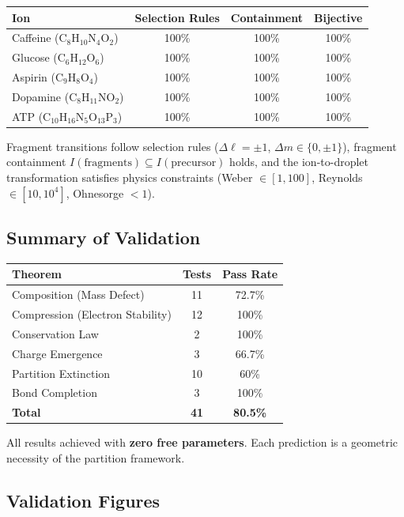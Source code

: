 \documentclass[twocolumn,10pt,a4paper]{article}
\theoremstyle{definition}
\theoremstyle{remark}
\begin{document}
\begin{center}
\begin{tabular}{lccc}
\toprule
Ion & Selection Rules & Containment & Bijective \\
\midrule
Caffeine (C$_8$H$_{10}$N$_4$O$_2$) & 100\% & 100\% & 100\% \\
Glucose (C$_6$H$_{12}$O$_6$) & 100\% & 100\% & 100\% \\
Aspirin (C$_9$H$_8$O$_4$) & 100\% & 100\% & 100\% \\
Dopamine (C$_8$H$_{11}$NO$_2$) & 100\% & 100\% & 100\% \\
ATP (C$_{10}$H$_{16}$N$_5$O$_{13}$P$_3$) & 100\% & 100\% & 100\% \\
\bottomrule
\end{tabular}
\end{center}

Fragment transitions follow selection rules ($\Delta \ell = \pm 1$, $\Delta m \in \{0, \pm 1\}$), fragment containment $I(\text{fragments}) \subseteq I(\text{precursor})$ holds, and the ion-to-droplet transformation satisfies physics constraints (Weber $\in [1,100]$, Reynolds $\in [10, 10^4]$, Ohnesorge $<1$).

\subsection{Summary of Validation}

\begin{center}
\begin{tabular}{lcc}
\toprule
Theorem & Tests & Pass Rate \\
\midrule
Composition (Mass Defect) & 11 & 72.7\% \\
Compression (Electron Stability) & 12 & 100\% \\
Conservation Law & 2 & 100\% \\
Charge Emergence & 3 & 66.7\% \\
Partition Extinction & 10 & 60\% \\
Bond Completion & 3 & 100\% \\
\midrule
\textbf{Total} & \textbf{41} & \textbf{80.5\%} \\
\bottomrule
\end{tabular}
\end{center}

All results achieved with \textbf{zero free parameters}. Each prediction is a geometric necessity of the partition framework.

\subsection{Validation Figures}
\end{document}
